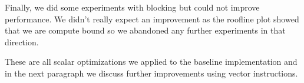 Finally, we did some experiments with blocking but could not improve performance. We didn't really expect an
improvement as the roofline plot showed that we are compute bound so we abandoned any further experiments in
that direction.

These are all scalar optimizations we applied to the baseline implementation and in the next paragraph we 
discuss further improvements using vector instructions.



